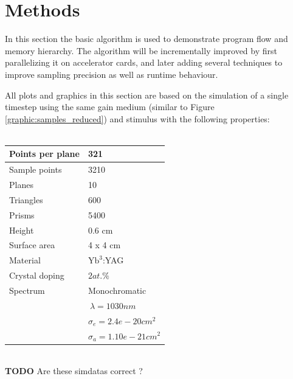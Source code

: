 \section{Methods}

In this section the basic algorithm is used to demonstrate
program flow and memory hierarchy. The algorithm will be incrementally improved
by first parallelizing it on accelerator cards, and later adding several
techniques to improve sampling precision as well as runtime behaviour.

All plots and graphics in this section
are based on the simulation of a single timestep using the same gain medium (similar to Figure
\ref{graphic:samples_reduced}) and stimulus
with the following properties:
\\
\\
\begin{tabular}{| l | l |}
\hline
Points per plane        & 321\\
\hline
Sample points           & 3210\\
\hline
Planes                  & 10\\
\hline
Triangles               & 600\\
\hline
Prisms                  & 5400\\
\hline
Height                  & 0.6 cm\\
\hline
Surface area            & 4 x 4 cm\\
\hline
Material                & $\text{Yb}^3$:YAG\\
\hline
Crystal doping          & $2at.\%$\\
\hline
Spectrum                & Monochromatic\\
                        & $~\lambda = 1030nm$\\
                        & $\sigma_e = 2.4e-20 cm^2$\\ 
                        & $\sigma_a =1.10e-21 cm^2$\\
\hline
\end{tabular}
\\
\textbf{TODO} Are these simdatas correct ?\\

